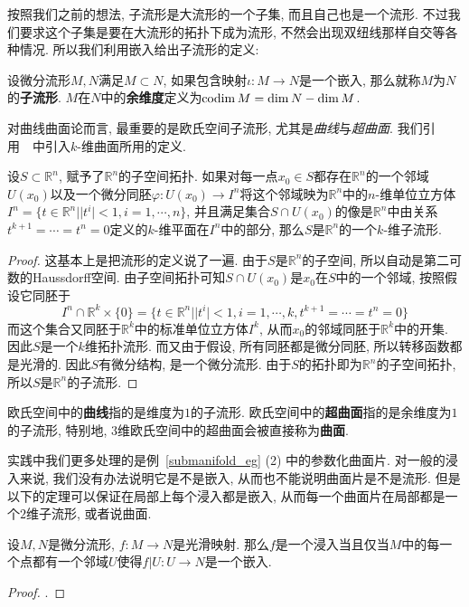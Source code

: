 按照我们之前的想法, 子流形是大流形的一个子集, 而且自己也是一个流形.
不过我们要求这个子集是要在大流形的拓扑下成为流形, 不然会出现双纽线那样自交等各种情况.
所以我们利用嵌入给出子流形的定义:
\begin{defn}
    设微分流形$M,N$满足$M\subset N$, 如果包含映射$\iota:M\to N$是一个嵌入, 那么就称$M$为$N$的\textbf{子流形}.
    $M$在$N$中的\textbf{余维度}定义为$\operatorname{codim}{M}=\dim{N}-\dim{M}$.
\end{defn}

对曲线曲面论而言, 最重要的是欧氏空间子流形, 尤其是\textit{曲线}与\textit{超曲面}.
我们引用~\parencite[8.7节定义1]{Zorich_MathAnal}~中引入$k$-维曲面所用的定义.
\begin{thm}
    设$S\subset\mathbb{R}^n$, 赋予了$\mathbb{R}^n$的子空间拓扑.
    如果对每一点$x_0\in S$都存在$\mathbb{R}^n$的一个邻域$U(x_0)$以及一个微分同胚$\varphi:U(x_0)\to I^n$将这个邻域映为$\mathbb{R}^n$中的$n$-维单位立方体$I^n=\{t\in\mathbb{R}^n||t^i|<1,i=1,\cdots,n\}$,
    并且满足集合$S\cap U(x_0)$的像是$\mathbb{R}^n$中由关系$t^{k+1}=\cdots=t^n=0$定义的$k$-维平面在$I^n$中的部分,
    那么$S$是$\mathbb{R}^n$的一个$k$-维子流形.
\end{thm}
\begin{proof}
    这基本上是把流形的定义说了一遍.
    由于$S$是$\mathbb{R}^n$的子空间, 所以自动是第二可数的Haussdorff空间.
    由子空间拓扑可知$S\cap U(x_0)$是$x_0$在$S$中的一个邻域, 按照假设它同胚于
    \[I^n\cap\mathbb{R}^k\times\{0\}=\{t\in\mathbb{R}^n||t^i|<1,i=1,\cdots,k,t^{k+1}=\cdots=t^n=0\}\]
    而这个集合又同胚于$\mathbb{R}^k$中的标准单位立方体$I^k$, 从而$x_0$的邻域同胚于$\mathbb{R}^k$中的开集.
    因此$S$是一个$k$维拓扑流形.
    而又由于假设, 所有同胚都是微分同胚, 所以转移函数都是光滑的.
    因此$S$有微分结构, 是一个微分流形.
    由于$S$的拓扑即为$\mathbb{R}^n$的子空间拓扑, 所以$S$是$\mathbb{R}^n$的子流形.
\end{proof}

\begin{defn}
    欧氏空间中的\textbf{曲线}指的是维度为$1$的子流形.
    欧氏空间中的\textbf{超曲面}指的是余维度为$1$的子流形, 特别地, $3$维欧氏空间中的超曲面会被直接称为\textbf{曲面}.
\end{defn}

实践中我们更多处理的是例~\ref{submanifold_eg} (2) 中的参数化曲面片.
对一般的浸入来说, 我们没有办法说明它是不是嵌入, 从而也不能说明曲面片是不是流形.
但是以下的定理可以保证在局部上每个浸入都是嵌入, 从而每一个曲面片在局部都是一个$2$维子流形, 或者说曲面.
\begin{thm}
    设$M,N$是微分流形, $f:M\to N$是光滑映射.
    那么$f$是一个浸入当且仅当$M$中的每一个点都有一个邻域$U$使得$f|U:U\to N$是一个嵌入.
\end{thm}
\begin{proof}
    \parencite[定理4.25]{Lee_IntroSmMani}.
\end{proof}

